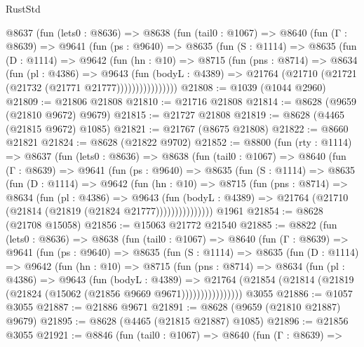 \begin{lexlean}{RustStd}
\begin{coremodule}
      @8637
        (fun (lets0 : @8636) =>
        @8638
          (fun (tail0 : @1067) =>
          @8640
            (fun (Γ : @8639) =>
            @9641
              (fun (ps : @9640) =>
              @8635
                (fun (S : @1114) =>
                @8635
                  (fun (D : @1114) =>
                  @9642
                    (fun (hn : @10) =>
                    @8715
                      (fun (pns : @8714) =>
                      @8634
                        (fun (pl : @4386) =>
                        @9643
                          (fun (bodyL : @4389) =>
                          @21764 (@21710 (@21721 (@21732 (@21771 @21777))))))))))))))))
@21808 := @1039 (@1044 @2960)
@21809 := @21806 @21808
@21810 := @21716 @21808
@21814 := @8628 (@9659 (@21810 @9672) @9679)
@21815 := @21727 @21808
@21819 := @8628 (@4465 (@21815 @9672) @1085)
@21821 := @21767 (@8675 @21808)
@21822 := @8660 @21821
@21824 := @8628 (@21822 @9702)
@21852 := @8800
    (fun (rty : @1114) =>
    @8637
      (fun (lets0 : @8636) =>
      @8638
        (fun (tail0 : @1067) =>
        @8640
          (fun (Γ : @8639) =>
          @9641
            (fun (ps : @9640) =>
            @8635
              (fun (S : @1114) =>
              @8635
                (fun (D : @1114) =>
                @9642
                  (fun (hn : @10) =>
                  @8715
                    (fun (pns : @8714) =>
                    @8634
                      (fun (pl : @4386) =>
                      @9643
                        (fun (bodyL : @4389) =>
                        @21764 (@21710 (@21814 (@21819 (@21824 @21777)))))))))))))))
    @1961
@21854 := @8628 (@21708 @15058)
@21856 := @15063 @21772 @21540
@21885 := @8822
    (fun (lets0 : @8636) =>
    @8638
      (fun (tail0 : @1067) =>
      @8640
        (fun (Γ : @8639) =>
        @9641
          (fun (ps : @9640) =>
          @8635
            (fun (S : @1114) =>
            @8635
              (fun (D : @1114) =>
              @9642
                (fun (hn : @10) =>
                @8715
                  (fun (pns : @8714) =>
                  @8634
                    (fun (pl : @4386) =>
                    @9643
                      (fun (bodyL : @4389) =>
                      @21764
                        (@21854 (@21814 (@21819 (@21824 (@15062 (@21856 @9669 @9671))))))))))))))))
    @3055
@21886 := @1057 @3055
@21887 := @21886 @9671
@21891 := @8628 (@9659 (@21810 @21887) @9679)
@21895 := @8628 (@4465 (@21815 @21887) @1085)
@21896 := @21856 @3055
@21921 := @8846
    (fun (tail0 : @1067) =>
    @8640
      (fun (Γ : @8639) =>

\end{coremodule}
\end{lexlean}
